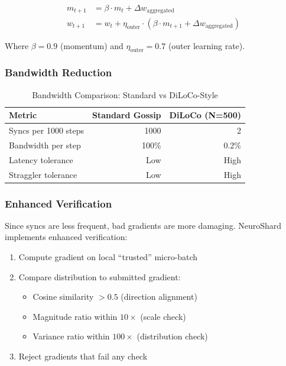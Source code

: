 \documentclass[11pt,a4paper]{article}
\begin{document}
\begin{align}
m_{t+1} &= \beta \cdot m_t + \Delta w_{\text{aggregated}} \\
w_{t+1} &= w_t + \eta_{\text{outer}} \cdot (\beta \cdot m_{t+1} + \Delta w_{\text{aggregated}})
\end{align}

Where $\beta = 0.9$ (momentum) and $\eta_{\text{outer}} = 0.7$ (outer learning rate).

\subsubsection{Bandwidth Reduction}

\begin{table}[H]
\centering
\caption{Bandwidth Comparison: Standard vs DiLoCo-Style}
\begin{tabular}{@{}lrr@{}}
\toprule
\textbf{Metric} & \textbf{Standard Gossip} & \textbf{DiLoCo (N=500)} \\
\midrule
Syncs per 1000 steps & 1000 & 2 \\
Bandwidth per step & 100\% & 0.2\% \\
Latency tolerance & Low & High \\
Straggler tolerance & Low & High \\
\bottomrule
\end{tabular}
\end{table}

\subsubsection{Enhanced Verification}

Since syncs are less frequent, bad gradients are more damaging. NeuroShard implements enhanced verification:

\begin{enumerate}
    \item Compute gradient on local ``trusted'' micro-batch
    \item Compare distribution to submitted gradient:
    \begin{itemize}
        \item Cosine similarity $> 0.5$ (direction alignment)
        \item Magnitude ratio within $10\times$ (scale check)
        \item Variance ratio within $100\times$ (distribution check)
    \end{itemize}
    \item Reject gradients that fail any check
\end{enumerate}
\end{document}
